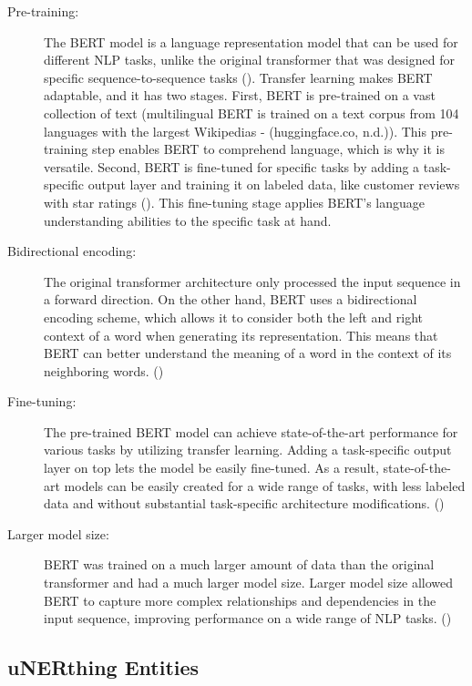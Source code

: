 \begin{description}
   \item[Pre-training:] The BERT model is a language representation model that can be used for different NLP tasks, unlike the original transformer that was designed for specific sequence-to-sequence tasks (\cite{devlin_bert_2019}). Transfer learning makes BERT adaptable, and it has two stages. First, BERT is pre-trained on a vast collection of text (multilingual BERT is trained on a text corpus from 104 languages with the largest Wikipedias - (huggingface.co, n.d.)). This pre-training step enables BERT to comprehend language, which is why it is versatile. Second, BERT is fine-tuned for specific tasks by adding a task-specific output layer and training it on labeled data, like customer reviews with star ratings (\cite{devlin_bert_2019}). This fine-tuning stage applies BERT's language understanding abilities to the specific task at hand. 
   
   \item[Bidirectional encoding:] The original transformer architecture only processed the input sequence in a forward direction. On the other hand, BERT uses a bidirectional encoding scheme, which allows it to consider both the left and right context of a word when generating its representation. This means that BERT can better understand the meaning of a word in the context of its neighboring words. (\cite{devlin_bert_2019})
   
   \item[Fine-tuning:] The pre-trained BERT model can achieve state-of-the-art performance for various tasks by utilizing transfer learning. Adding a task-specific output layer on top lets the model be easily fine-tuned. As a result, state-of-the-art models can be easily created for a wide range of tasks, with less labeled data and without substantial task-specific architecture modifications. (\cite{devlin_bert_2019})
   
   \item[Larger model size:] BERT was trained on a much larger amount of data than the original transformer and had a much larger model size. Larger model size allowed BERT to capture more complex relationships and dependencies in the input sequence, improving performance on a wide range of NLP tasks. (\cite{devlin_bert_2019})
\end{description}

\subsection{uNERthing Entities}

